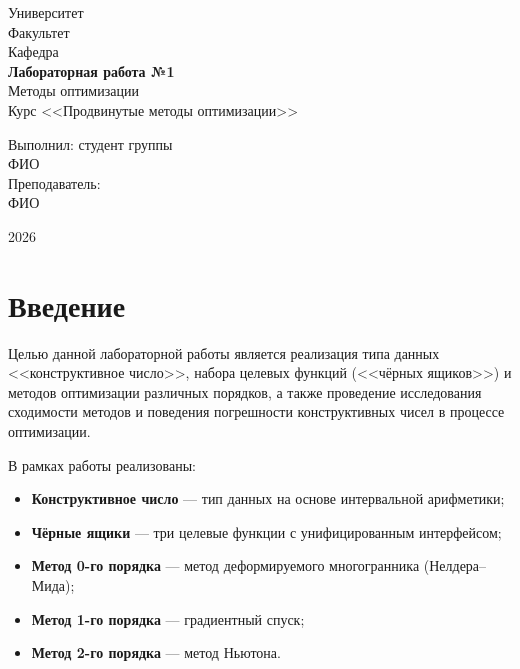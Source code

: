 \documentclass[a4paper, 14pt]{extarticle}
\begin{document}
\begin{titlepage}
    \centering
    \vspace*{1cm}

    {\large Университет}\\[0.3cm]
    {\large Факультет}\\[0.3cm]
    {\large Кафедра}\\[2cm]

    {\LARGE\bfseries Лабораторная работа №1}\\[0.5cm]
    {\Large Методы оптимизации}\\[0.3cm]
    {\large Курс <<Продвинутые методы оптимизации>>}\\[3cm]

    \begin{flushright}
        \large
        Выполнил: студент группы \\
        ФИО \\[0.5cm]
        Преподаватель: \\
        ФИО
    \end{flushright}

    \vfill
    {\large 2026}
\end{titlepage}

\tableofcontents
\newpage

\section{Введение}

Целью данной лабораторной работы является реализация типа данных <<конструктивное число>>, набора целевых функций (<<чёрных ящиков>>) и методов оптимизации различных порядков, а также проведение исследования сходимости методов и поведения погрешности конструктивных чисел в процессе оптимизации.

В рамках работы реализованы:
\begin{itemize}
    \item \textbf{Конструктивное число} --- тип данных на основе интервальной арифметики;
    \item \textbf{Чёрные ящики} --- три целевые функции с унифицированным интерфейсом;
    \item \textbf{Метод 0-го порядка} --- метод деформируемого многогранника (Нелдера--Мида);
    \item \textbf{Метод 1-го порядка} --- градиентный спуск;
    \item \textbf{Метод 2-го порядка} --- метод Ньютона.
\end{itemize}
\end{document}
